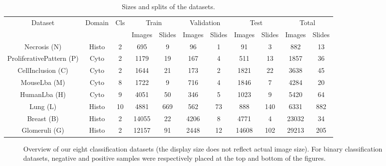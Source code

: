 \begin{table*}
    \center 
    \begin{tabular}{|c|c|c||cc|cc|cc||cc|}
        \hline
        \multirow{2}{*}{Dataset} & \multirow{2}{*}{Domain} & \multirow{2}{*}{Cls} & \multicolumn{2}{c|}{Train} & \multicolumn{2}{c|}{Validation} & \multicolumn{2}{c||}{Test} & \multicolumn{2}{c|}{Total} \\
        \cline{4-11}
        & & & Images & Slides & Images & Slides & Images & Slides & Images & Slides \\
        \hline
        Necrosis (N) & Histo & 2 & 695 & 9 & 96 & 1 & 91 & 3 & 882 & 13 \\ %
        ProliferativePattern (P) & Cyto & 2 & 1179 & 19 & 167 & 4 & 511 & 13 & 1857 & 36 \\ %
        CellInclusion (C) & Cyto & 2 & 1644 & 21 & 173 & 2 & 1821 & 22 & 3638 & 45 \\ %
        MouseLba  (M) & Cyto & 8 & 1722 & 9 & 716 & 4 & 1846 & 7 & 4284 & 20 \\ %
        HumanLba (H) & Cyto & 9 & 4051 & 50 & 346 & 5 & 1023 & 9 & 5420 & 64 \\ %
        Lung (L) & Histo & 10 & 4881 & 669 & 562 & 73 & 888 & 140 & 6331 & 882 \\ %
        Breast (B) & Histo & 2 & 14055 & 22 & 4206 & 8 & 4771 & 4 & 23032 & 34 \\ %
        Glomeruli (G) \parencite{maree2016approach} & Histo & 2  & 12157 & 91 & 2448 & 12 & 14608 & 102 & 29213 & 205 \\ %
        \hline
    \end{tabular}
    \caption{Sizes and splits of the datasets.}
    \label{tab:comp:dataset_information}
\end{table*}

\begin{figure*}
	\center
	\caption{Overview of our eight classification datasets (the display size does not reflect actual image size). For binary classification datasets, negative and positive samples were respectively placed at the top and bottom of the figures.}
	\label{fig:comp:dataset_samples}
\end{figure*}
 

